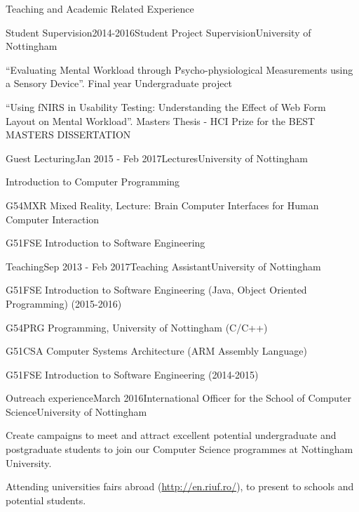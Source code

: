 \documentclass{resume} %
\begin{document}
\begin{rSection}{Teaching and Academic Related Experience}
	\begin{rSubsection}{Student Supervision}{2014-2016}{Student Project Supervision}{University of Nottingham}
        \item  ``Evaluating Mental Workload through Psycho-physiological Measurements using a Sensory Device''. Final year Undergraduate project
        \item  ``Using fNIRS in Usability Testing: Understanding the Effect of Web Form Layout on Mental Workload''. Masters Thesis - HCI Prize for the BEST MASTERS DISSERTATION
    \end{rSubsection}
    \vspace{-1 mm}
\vspace{-1 mm}
    \begin{rSubsection}{Guest Lecturing}{Jan 2015 - Feb 2017}{Lectures}{University of Nottingham}
    	\item Introduction to Computer Programming 
        \item G54MXR Mixed Reality, Lecture: Brain Computer Interfaces for Human Computer Interaction
        \item G51FSE Introduction to Software Engineering
    \end{rSubsection}
\vspace{-1 mm}
    \begin{rSubsection}{Teaching}{Sep 2013 - Feb 2017}{Teaching Assistant}{University of Nottingham}
        \item G51FSE Introduction to Software Engineering (Java, Object Oriented Programming) (2015-2016)
        \item G54PRG Programming, University of Nottingham (C/C++)
        \item G51CSA Computer Systems Architecture (ARM Assembly Language)
        \item G51FSE Introduction to Software Engineering (2014-2015)
    \end{rSubsection}
\vspace{-1 mm}
    \begin{rSubsection}{Outreach experience}{March 2016}{International Officer for the School of Computer Science}{University of Nottingham}
        \item Create campaigns to meet and attract excellent potential undergraduate and postgraduate students to join our Computer Science programmes at Nottingham University.
        \item Attending universities fairs abroad (\url{http://en.riuf.ro/}), to present to schools and potential students.

\end{rSubsection}
\end{rSection}
\end{document}
